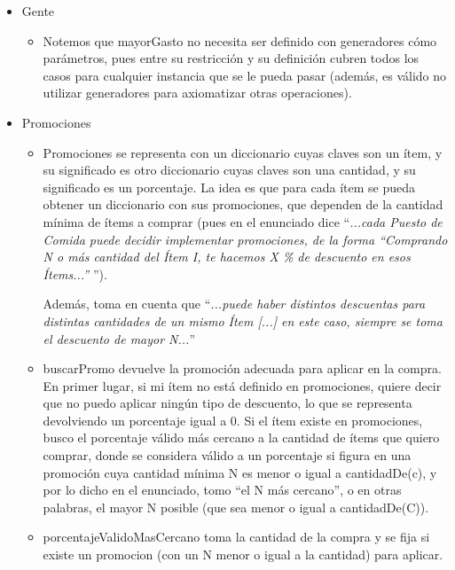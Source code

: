\documentclass[10pt, a4paper]{article}
\begin{document}
{\begin{itemize}
    \item Gente
        \begin{itemize}
            \item Notemos que mayorGasto no necesita ser definido con generadores cómo parámetros, pues entre su restricción y su
            definición cubren todos los casos para cualquier instancia que se le pueda pasar (además, es válido no utilizar generadores
            para axiomatizar otras operaciones).
        \end{itemize}
    
    \item Promociones
        \begin{itemize}
            \item Promociones se representa con un diccionario cuyas claves son un ítem, y su significado es otro diccionario cuyas
            claves son una cantidad, y su significado es un porcentaje. La idea es que para cada ítem se pueda obtener un diccionario con sus promociones, que dependen de la cantidad mínima de ítems a comprar (pues en el enunciado dice 
            ``\textit{...cada Puesto de Comida puede decidir implementar promociones, de la forma “Comprando N o más cantidad del Ítem I, te hacemos X \% de descuento en esos Ítems...” }'').
            
            Además, toma en cuenta que ``\textit{...puede haber distintos descuentas para 
            distintas cantidades de un mismo Ítem [...] en este caso, siempre se toma el descuento de mayor N...}''

            \item buscarPromo devuelve la promoción adecuada para aplicar en la compra. En primer lugar, si mi ítem no está definido en
            promociones, quiere decir que no puedo aplicar ningún tipo de descuento, lo que se representa devolviendo un porcentaje igual a 0.
            Si el ítem existe en promociones, busco el porcentaje válido más cercano a la cantidad de ítems que quiero comprar, donde 
            se considera válido a un porcentaje si figura en una promoción cuya cantidad mínima N es menor o igual a cantidadDe(c), y por lo dicho en el enunciado, tomo ``el N más cercano'', o en otras palabras, el mayor N posible (que sea menor o igual a
            cantidadDe(C)).
            
            \item porcentajeValidoMasCercano toma la cantidad de la compra y se fija si existe un promocion (con un N menor o igual a la
            cantidad) para aplicar.


\end{itemize}
\end{itemize}}
\end{document}
